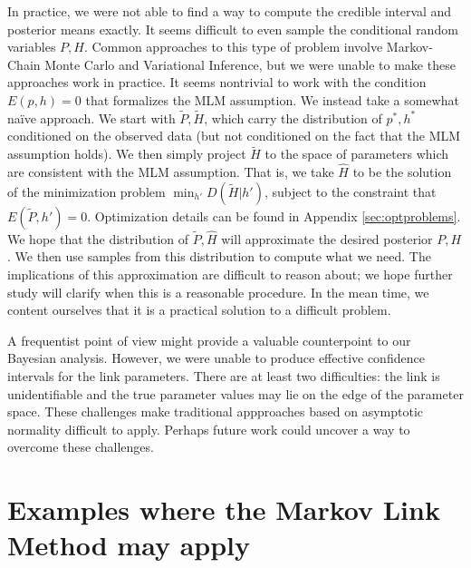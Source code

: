 In practice, we were not able to find a way to compute the credible interval and posterior means exactly.  It seems difficult to even sample the conditional random variables $P,H$.  Common approaches to this type of problem involve Markov-Chain Monte Carlo and Variational Inference, but we were unable to make these approaches work in practice.  It seems nontrivial to work with the condition $E(p,h)=0$ that formalizes the MLM assumption.  We instead take a somewhat na\"ive approach.  We start with $\tilde P,\tilde H$, which carry the distribution of $p^*,h^*$ conditioned on the observed data (but not conditioned on the fact that the MLM assumption holds).  We then simply project $\tilde H$ to the space of parameters which are consistent with the MLM assumption.  That is, we take $\hat H$ to be the solution of the minimization problem $\min_{h'}D(\tilde H|h')$, subject to the constraint that $E(\tilde P,h')=0$.  Optimization details can be found in Appendix \ref{sec:optproblems}.  We hope that the distribution of $\tilde P,\hat H$ will approximate the desired posterior $P,H$.  We then use samples from this distribution to compute what we need.  The implications of this approximation are difficult to reason about; we hope further study will clarify when this is a reasonable procedure.  In the mean time, we content ourselves that it is a practical solution to a difficult problem.

A frequentist point of view might provide a valuable counterpoint to our Bayesian analysis.  However, we were unable to produce effective confidence intervals for the link parameters.  There are at least two difficulties: the link is unidentifiable and the true parameter values may lie on the edge of the parameter space.  These challenges make traditional appproaches based on asymptotic normality difficult to apply.  Perhaps future work could uncover a way to overcome these challenges.


\section{Examples where the Markov Link Method may apply}

